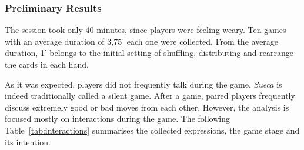 \subsubsection{Preliminary Results}
The session took only 40 minutes, since players were feeling weary.
Ten games with an average duration of 3,75' each one were collected.
From the average duration, 1' belongs to the initial setting of shuffling, distributing and rearrange the cards in each hand.

As it was expected, players did not frequently talk during the game.
\emph{Sueca} is indeed traditionally called a silent game.
After a game, paired players frequently discuss extremely good or bad moves from each other.
However, the analysis is focused mostly on interactions during the game.
The following Table~\ref{tab:interactions} summarises the collected expressions, the game stage and its intention.


\begin{table}[h]
\caption{Rank of cards per suit and respective reward values}
\label{tab:interactions}
\end{table}




